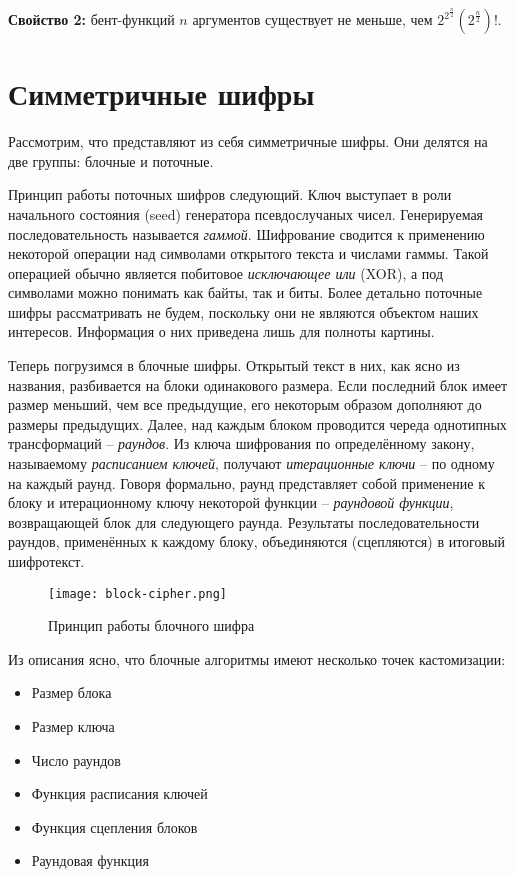 \documentclass[12pt, a4paper, reqno]{article}
\begin{document}
    \textbf{Свойство 2:} бент-функций $n$ аргументов существует не меньше, чем
    $2^{2^{\frac{n}{2}}}(2^{\frac{n}{2}})!$.

\section{Симметричные шифры}

    Рассмотрим, что представляют из себя симметричные шифры. Они делятся на две группы: блочные и
    поточные.

    Принцип работы поточных шифров следующий. Ключ выступает в роли начального состояния (seed)
    генератора псевдослучаных чисел. Генерируемая последовательность называется \textit{гаммой}.
    Шифрование сводится к применению некоторой операции над символами открытого текста и числами
    гаммы. Такой операцией обычно является побитовое \textit{исключающее или} (XOR), а под символами
    можно понимать как байты, так и биты. Более детально поточные шифры рассматривать не будем,
    поскольку они не являются объектом наших интересов. Информация о них приведена лишь для полноты
    картины.

    Теперь погрузимся в блочные шифры. Открытый текст в них, как ясно из названия, разбивается на
    блоки одинакового размера. Если последний блок имеет размер меньший, чем все предыдущие, его
    некоторым образом дополняют до размеры предыдущих. Далее, над каждым блоком проводится череда
    однотипных трансформаций -- \textit{раундов}. Из ключа шифрования по определённому закону,
    называемому \textit{расписанием ключей}, получают \textit{итерационные ключи} -- по одному на
    каждый раунд. Говоря формально, раунд представляет собой применение к блоку и итерационному
    ключу некоторой функции -- \textit{раундовой функции}, возвращающей блок для следующего раунда.
    Результаты последовательности раундов, применённых к каждому блоку, объединяются (сцепляются) в
    итоговый шифротекст.

    \begin{figure}[H]
        \centering
        \texttt{[image: block-cipher.png]}
        \caption{Принцип работы блочного шифра}
    \end{figure}

    Из описания ясно, что блочные алгоритмы имеют несколько точек кастомизации:
    \begin{itemize}
        \item Размер блока
        \item Размер ключа
        \item Число раундов
        \item Функция расписания ключей
        \item Функция сцепления блоков
        \item Раундовая функция
    \end{itemize}
\end{document}

